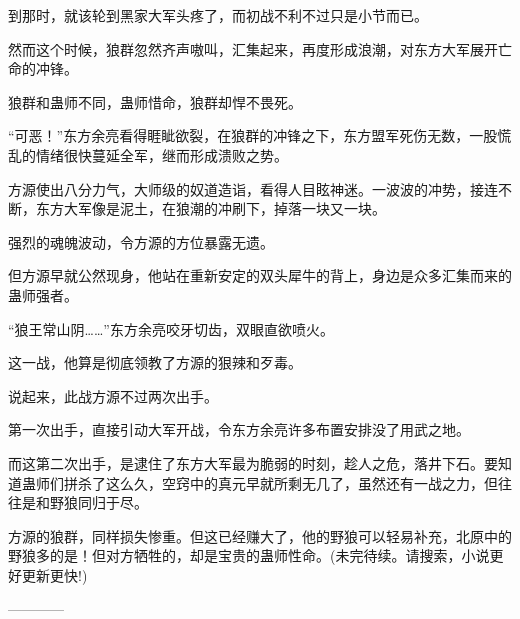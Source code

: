 \begin{this_body}
到那时，就该轮到黑家大军头疼了，而初战不利不过只是小节而已。

然而这个时候，狼群忽然齐声嗷叫，汇集起来，再度形成浪潮，对东方大军展开亡命的冲锋。

狼群和蛊师不同，蛊师惜命，狼群却悍不畏死。

“可恶！”东方余亮看得睚眦欲裂，在狼群的冲锋之下，东方盟军死伤无数，一股慌乱的情绪很快蔓延全军，继而形成溃败之势。

方源使出八分力气，大师级的奴道造诣，看得人目眩神迷。一波波的冲势，接连不断，东方大军像是泥土，在狼潮的冲刷下，掉落一块又一块。

强烈的魂魄波动，令方源的方位暴露无遗。

但方源早就公然现身，他站在重新安定的双头犀牛的背上，身边是众多汇集而来的蛊师强者。

“狼王常山阴……”东方余亮咬牙切齿，双眼直欲喷火。

这一战，他算是彻底领教了方源的狠辣和歹毒。

说起来，此战方源不过两次出手。

第一次出手，直接引动大军开战，令东方余亮许多布置安排没了用武之地。

而这第二次出手，是逮住了东方大军最为脆弱的时刻，趁人之危，落井下石。要知道蛊师们拼杀了这么久，空窍中的真元早就所剩无几了，虽然还有一战之力，但往往是和野狼同归于尽。

方源的狼群，同样损失惨重。但这已经赚大了，他的野狼可以轻易补充，北原中的野狼多的是！但对方牺牲的，却是宝贵的蛊师性命。(未完待续。请搜索，小说更好更新更快!)

------------

\end{this_body}

